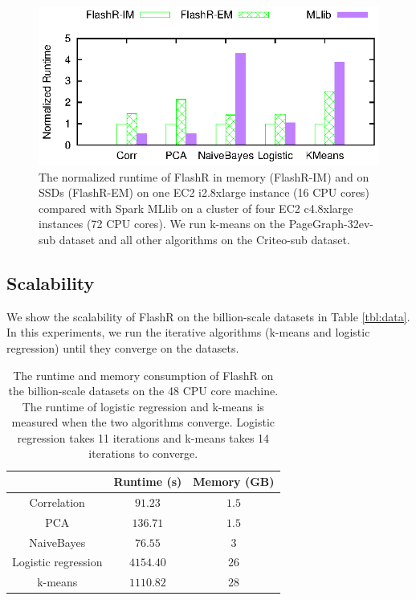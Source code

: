 \begin{figure}
  \vspace{-5pt}
	\centering
	\footnotesize
	\includegraphics{FlashMatrix_figs/FlashR-vs-dist-EC2.eps}
	\vspace{-8pt}
	\caption{The normalized runtime of FlashR in memory (FlashR-IM) and
	on SSDs (FlashR-EM) on one EC2 i2.8xlarge instance (16 CPU cores) compared
	with Spark MLlib on a cluster of four EC2 c4.8xlarge instances (72 CPU cores).
	We run k-means on the PageGraph-32ev-sub dataset and all other algorithms
	on the Criteo-sub dataset.}
	\label{perf:rt}
  \vspace{-10pt}
\end{figure}

\subsection{Scalability}

We show the scalability of FlashR on the billion-scale datasets in Table
\ref{tbl:data}. In this experiments, we run the iterative algorithms
(k-means and logistic regression) until they converge on the datasets.

\begin{table}
\begin{center}
\footnotesize
\begin{tabular}{|c|c|c|}
\hline
	& Runtime (s) & Memory (GB) \\
\hline
Correlation & $91.23$ & $1.5$ \\
\hline
PCA & $136.71$ & $1.5$ \\
\hline
NaiveBayes & $76.55$ & $3$ \\
\hline
Logistic regression & $4154.40$ & $26$ \\
\hline
k-means & $1110.82$ & $28$ \\
\hline
\end{tabular}
\normalsize
\end{center}
\caption{The runtime and memory consumption of FlashR on the billion-scale
	datasets on the 48 CPU core machine.
	The runtime of logistic regression and k-means is measured when the two
	algorithms converge. Logistic regression takes 11 iterations and k-means
	takes 14 iterations to converge.}
\label{tbl:scale}
\end{table}

